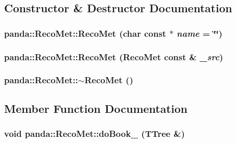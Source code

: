 \subsection{Constructor \& Destructor Documentation}
\hypertarget{classpanda_1_1RecoMet_a3d2d9417bc9084a621417810b2fc03d7}{
\subsubsection[{RecoMet}]{\setlength{\rightskip}{0pt plus 5cm}panda::RecoMet::RecoMet (char const $\ast$ {\em name} = {\ttfamily \char`\"{}\char`\"{}})}}
\label{classpanda_1_1RecoMet_a3d2d9417bc9084a621417810b2fc03d7}
\hypertarget{classpanda_1_1RecoMet_a23c0b8b3f990ec24f726d0522c959043}{
\subsubsection[{RecoMet}]{\setlength{\rightskip}{0pt plus 5cm}panda::RecoMet::RecoMet ({\bf RecoMet} const \& {\em \_\-src})}}
\label{classpanda_1_1RecoMet_a23c0b8b3f990ec24f726d0522c959043}
\hypertarget{classpanda_1_1RecoMet_a5984b85ef78150f50822cb4e4201893e}{
\subsubsection[{$\sim$RecoMet}]{\setlength{\rightskip}{0pt plus 5cm}panda::RecoMet::$\sim$RecoMet ()}}
\label{classpanda_1_1RecoMet_a5984b85ef78150f50822cb4e4201893e}


\subsection{Member Function Documentation}
\hypertarget{classpanda_1_1RecoMet_aa276d8e80b96770de06ea62231930a35}{
\subsubsection[{doBook\_\-}]{\setlength{\rightskip}{0pt plus 5cm}void panda::RecoMet::doBook\_\- (TTree \&)}}
\label{classpanda_1_1RecoMet_aa276d8e80b96770de06ea62231930a35}



